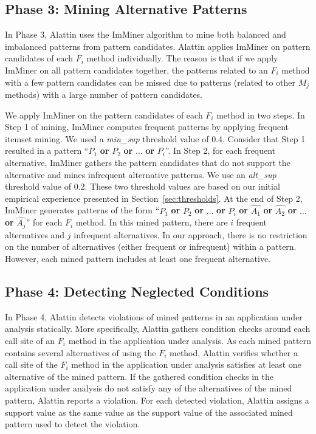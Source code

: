 \subsection {Phase 3: Mining Alternative Patterns}
\label{sec:patternminer}

In Phase 3, Alattin uses the ImMiner algorithm to mine both balanced and imbalanced patterns from pattern candidates. Alattin applies ImMiner on pattern candidates of each $F_i$ method individually. The reason is that if we apply ImMiner on all pattern candidates together, the patterns related to an $F_i$ method with a few pattern candidates can be missed due to patterns (related to other $M_j$ methods) with a large number of pattern candidates. 

We apply ImMiner on the pattern candidates of each $F_i$ method in two steps. In Step 1 of mining, ImMiner computes frequent patterns by applying frequent itemset mining. We used a \emph{min\_sup} threshold value of $0.4$. Consider that Step 1 resulted in a pattern ``$P_1$ \textbf{or} $P_2$ \textbf{or} $\ldots$ \textbf{or} $P_i$''. In Step 2, for each frequent alternative, ImMiner gathers the pattern candidates that do not support the alternative and mines infrequent alternative patterns. We use an \emph{alt\_sup} threshold value of $0.2$. These two threshold values are based on our initial empirical experience presented in Section~\ref{sec:thresholds}. At the end of Step 2, ImMiner generates patterns of the form  ``$P_1$ \textbf{or} $P_2$ \textbf{or} $\ldots$ \textbf{or} $P_i$ \textbf{or} $\hat{A_1}$ \textbf{or} $\hat{A_2}$ \textbf{or} $\ldots$ \textbf{or} $\hat{A_j}$'' for each $F_i$ method. In this mined pattern, there are $i$ frequent alternatives and $j$ infrequent alternatives. In our approach, there is no restriction on the number of alternatives (either frequent or infrequent) within a pattern. However, each mined pattern includes at least one frequent alternative.

\subsection{Phase 4: Detecting Neglected Conditions}
\label{sec:anamolydetector}

In Phase 4, Alattin detects violations of mined patterns in an application under analysis statically. More specifically,
Alattin gathers condition checks around each call site of an $F_i$ method in the application under analysis. As each mined pattern contains several alternatives of using the $F_i$ method, Alattin verifies whether a call site of the $F_i$ method in the application under analysis satisfies at least one alternative of the mined pattern. If the gathered condition checks in the application under analysis do not satisfy any of the alternatives of the mined pattern, Alattin reports a violation.  For each detected violation, Alattin assigns a support value as the same value as the support value of the associated mined pattern used to detect the violation. 
